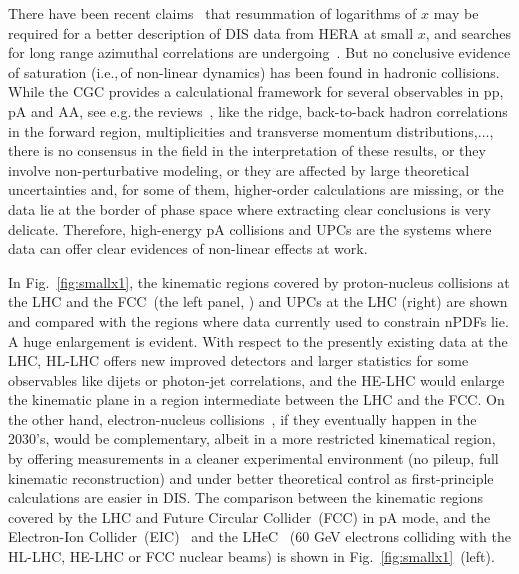 \documentclass[../report.tex]{subfiles}
\begin{document}
There have been recent claims~\cite{Ball:2017otu,Abdolmaleki:2018jln} that resummation of logarithms of $x$ may be required for a better description of DIS data from HERA at small $x$, and searches for long range azimuthal correlations are undergoing~\cite{zeusichep2018}. 
But no conclusive evidence of saturation (i.e.,\,of non-linear dynamics) has been found in hadronic collisions. While the CGC provides a calculational framework for several observables in pp, pA and AA, see e.g.\,the reviews~\cite{Albacete:2013tpa,Lappi:2015jka}, like the ridge, back-to-back hadron correlations in the forward region, multiplicities and transverse momentum distributions,$\dots$,  there is no consensus in the field in the interpretation of these results, or they involve non-perturbative modeling, or they are affected by large theoretical uncertainties and, for some of them, higher-order calculations are missing, or the data lie at the border of phase space where extracting clear conclusions is very delicate. 
Therefore, high-energy pA collisions and UPCs are the systems where data can offer clear evidences of non-linear effects at work.

In Fig.~\ref{fig:smallx1}, the kinematic regions covered by proton-nucleus collisions at the LHC and the FCC~(the left panel, \cite{Dainese:2016gch}) and UPCs at the LHC (right) are shown and compared with the regions where data currently used to constrain nPDFs lie.
A huge enlargement is evident. With respect to the presently existing data at the LHC, HL-LHC offers new improved detectors and larger statistics for some observables like dijets or photon-jet correlations, and the HE-LHC would enlarge the kinematic plane in a region intermediate between the LHC and the FCC. On the other hand, electron-nucleus collisions~\cite{AbelleiraFernandez:2012cc,Accardi:2012qut}, if they eventually happen in the 2030's, would be complementary, albeit in a more restricted kinematical region, by offering measurements in a cleaner experimental environment (no pileup, full kinematic reconstruction) and under better theoretical control as first-principle calculations are easier in DIS. 
The comparison between the kinematic regions covered by the LHC and Future Circular Collider~(FCC) in pA mode, and the Electron-Ion Collider~(EIC)~\cite{Accardi:2012qut} and the LHeC~\cite{AbelleiraFernandez:2012cc} (60 GeV electrons colliding with the HL-LHC, HE-LHC or FCC nuclear beams) is shown in Fig.~\ref{fig:smallx1}~(left).
\end{document}
